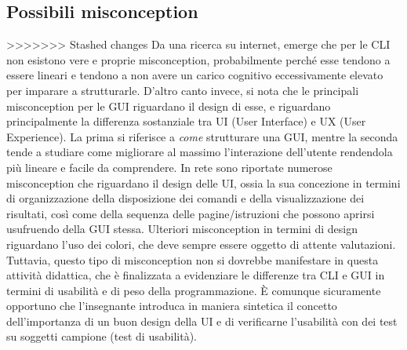   \subsection{Possibili misconception}
>>>>>>> Stashed changes
  Da una ricerca su internet, emerge che per le CLI non esistono vere e proprie misconception, probabilmente perché esse tendono a essere lineari e tendono a non avere un carico cognitivo eccessivamente elevato per imparare a strutturarle.
  D'altro canto invece, si nota che le principali misconception per le GUI riguardano il design di esse, e riguardano principalmente la differenza sostanziale tra UI (User Interface) e UX (User Experience). La prima si riferisce a \textit{come} strutturare una GUI, mentre la seconda tende a studiare come migliorare al massimo l'interazione dell'utente rendendola più lineare e facile da comprendere.
  In rete sono riportate numerose misconception che riguardano il design delle UI, ossia la sua concezione in termini di organizzazione della disposizione dei comandi e della visualizzazione dei risultati, così come della sequenza delle pagine/istruzioni che possono aprirsi usufruendo della GUI stessa.
  Ulteriori misconception in termini di design riguardano l'uso dei colori, che deve sempre essere oggetto di attente valutazioni.
  Tuttavia, questo tipo di misconception non si dovrebbe manifestare in questa attività didattica, che è finalizzata a evidenziare le differenze tra CLI e GUI in termini di usabilità e di peso della programmazione.
  È comunque sicuramente opportuno che l'insegnante introduca in maniera sintetica il concetto dell'importanza di un buon design della UI e di verificarne l'usabilità con dei test su soggetti campione (test di usabilità).
  
